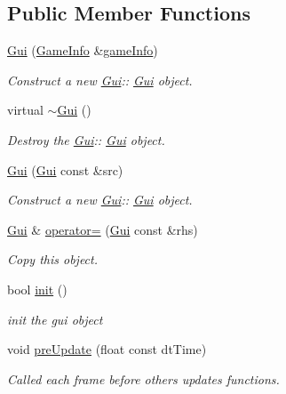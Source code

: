 \subsection*{Public Member Functions}
\begin{DoxyCompactItemize}
\item 
\hyperlink{class_gui_a470a9b3fdd6f43eb46f11276220013a4}{Gui} (\hyperlink{struct_game_info}{Game\+Info} \&\hyperlink{class_gui_af562e2e6f0b773511162d1a5171d7475}{game\+Info})
\begin{DoxyCompactList}\small\item\em Construct a new \hyperlink{class_gui}{Gui}\+:\+: \hyperlink{class_gui}{Gui} object. \end{DoxyCompactList}\item 
\mbox{\label{class_gui_a4fd8485d226f9b8a2ac2d81d7f0f3598}} 
virtual \hyperlink{class_gui_a4fd8485d226f9b8a2ac2d81d7f0f3598}{$\sim$\+Gui} ()
\begin{DoxyCompactList}\small\item\em Destroy the \hyperlink{class_gui}{Gui}\+:\+: \hyperlink{class_gui}{Gui} object. \end{DoxyCompactList}\item 
\hyperlink{class_gui_aaaa336f8359cadcbbad3eb204dc7f95b}{Gui} (\hyperlink{class_gui}{Gui} const \&src)
\begin{DoxyCompactList}\small\item\em Construct a new \hyperlink{class_gui}{Gui}\+:\+: \hyperlink{class_gui}{Gui} object. \end{DoxyCompactList}\item 
\hyperlink{class_gui}{Gui} \& \hyperlink{class_gui_ac260d502b2a5440591c3e4e4520acf94}{operator=} (\hyperlink{class_gui}{Gui} const \&rhs)
\begin{DoxyCompactList}\small\item\em Copy this object. \end{DoxyCompactList}\item 
bool \hyperlink{class_gui_a735bdb412232cf6980819e21f1dbdb66}{init} ()
\begin{DoxyCompactList}\small\item\em init the gui object \end{DoxyCompactList}\item 
void \hyperlink{class_gui_a8e51befeff5deda5a8d0283b1af7446e}{pre\+Update} (float const dt\+Time)
\begin{DoxyCompactList}\small\item\em Called each frame before others updates functions. \end{DoxyCompactList}\item 

\end{DoxyCompactItemize}
